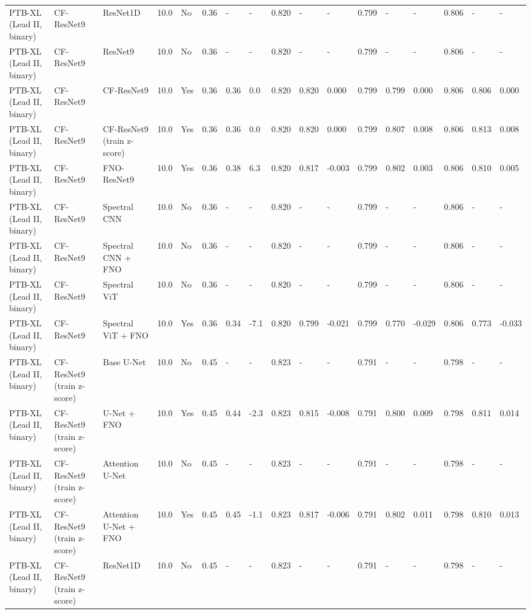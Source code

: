 \begin{longtable}{lllllllllllllllll}
PTB-XL (Lead II, binary) & CF-ResNet9 & ResNet1D & 10.0 & No & 0.36 & - & - & 0.820 & - & - & 0.799 & - & - & 0.806 & - & - \\
PTB-XL (Lead II, binary) & CF-ResNet9 & ResNet9 & 10.0 & No & 0.36 & - & - & 0.820 & - & - & 0.799 & - & - & 0.806 & - & - \\
PTB-XL (Lead II, binary) & CF-ResNet9 & CF-ResNet9 & 10.0 & Yes & 0.36 & 0.36 & 0.0 & 0.820 & 0.820 & 0.000 & 0.799 & 0.799 & 0.000 & 0.806 & 0.806 & 0.000 \\
PTB-XL (Lead II, binary) & CF-ResNet9 & CF-ResNet9 (train z-score) & 10.0 & Yes & 0.36 & 0.36 & 0.0 & 0.820 & 0.820 & 0.000 & 0.799 & 0.807 & 0.008 & 0.806 & 0.813 & 0.008 \\
PTB-XL (Lead II, binary) & CF-ResNet9 & FNO-ResNet9 & 10.0 & Yes & 0.36 & 0.38 & 6.3 & 0.820 & 0.817 & -0.003 & 0.799 & 0.802 & 0.003 & 0.806 & 0.810 & 0.005 \\
PTB-XL (Lead II, binary) & CF-ResNet9 & Spectral CNN & 10.0 & No & 0.36 & - & - & 0.820 & - & - & 0.799 & - & - & 0.806 & - & - \\
PTB-XL (Lead II, binary) & CF-ResNet9 & Spectral CNN + FNO & 10.0 & No & 0.36 & - & - & 0.820 & - & - & 0.799 & - & - & 0.806 & - & - \\
PTB-XL (Lead II, binary) & CF-ResNet9 & Spectral ViT & 10.0 & No & 0.36 & - & - & 0.820 & - & - & 0.799 & - & - & 0.806 & - & - \\
PTB-XL (Lead II, binary) & CF-ResNet9 & Spectral ViT + FNO & 10.0 & Yes & 0.36 & 0.34 & -7.1 & 0.820 & 0.799 & -0.021 & 0.799 & 0.770 & -0.029 & 0.806 & 0.773 & -0.033 \\
PTB-XL (Lead II, binary) & CF-ResNet9 (train z-score) & Base U-Net & 10.0 & No & 0.45 & - & - & 0.823 & - & - & 0.791 & - & - & 0.798 & - & - \\
PTB-XL (Lead II, binary) & CF-ResNet9 (train z-score) & U-Net + FNO & 10.0 & Yes & 0.45 & 0.44 & -2.3 & 0.823 & 0.815 & -0.008 & 0.791 & 0.800 & 0.009 & 0.798 & 0.811 & 0.014 \\
PTB-XL (Lead II, binary) & CF-ResNet9 (train z-score) & Attention U-Net & 10.0 & No & 0.45 & - & - & 0.823 & - & - & 0.791 & - & - & 0.798 & - & - \\
PTB-XL (Lead II, binary) & CF-ResNet9 (train z-score) & Attention U-Net + FNO & 10.0 & Yes & 0.45 & 0.45 & -1.1 & 0.823 & 0.817 & -0.006 & 0.791 & 0.802 & 0.011 & 0.798 & 0.810 & 0.013 \\
PTB-XL (Lead II, binary) & CF-ResNet9 (train z-score) & ResNet1D & 10.0 & No & 0.45 & - & - & 0.823 & - & - & 0.791 & - & - & 0.798 & - & - \\

\end{longtable}
